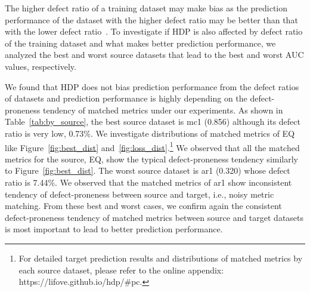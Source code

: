 The higher defect ratio of a training dataset may make bias as the prediction performance of the dataset with the higher defect ratio may be better than that with the lower defect ratio~\cite{Tantithamthavorn16}. To investigate if HDP is also affected by defect ratio of the training dataset and what makes better prediction performance, we analyzed the best and worst source datasets that lead to the best and worst AUC values, respectively.

We found that HDP does not bias prediction performance from the defect ratios of datasets and prediction performance is highly depending on the defect-proneness tendency of matched metrics under our experiments.
As shown in Table~\ref{tab:by_source}, the best source dataset is mc1 (0.856) although its defect ratio is very low, 0.73\%. We investigate distributions of matched metrics of EQ like Figure~\ref{fig:best_dist} and~\ref{fig:loss_dist}.\footnote{For detailed target prediction results and distributions of matched metrics by each source dataset, please refer to the online appendix: https://lifove.github.io/hdp/\#pc.} We observed that all the matched metrics for the source, EQ, show the typical defect-proneness tendency similarly to Figure~\ref{fig:best_dist}. The worst source dataset is ar1 (0.320) whose defect ratio is 7.44\%. We observed that the matched metrics of ar1 show inconsistent tendency of defect-proneness between source and target, i.e., noisy metric matching. From these best and worst cases, we confirm again the consistent defect-proneness tendency of matched metrics between source and target datasets is most important to lead to better prediction performance.






